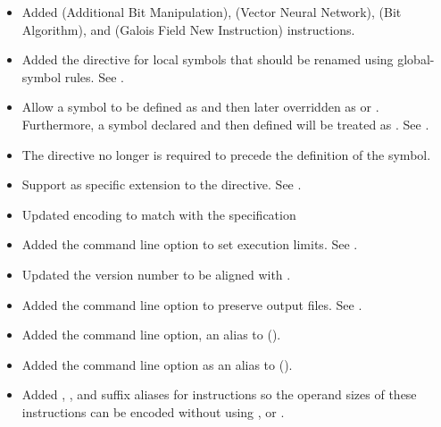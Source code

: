 \begin{itemize}
    \item{Added   (Additional Bit Manipulation), 
        (Vector Neural Network),  (Bit Algorithm), and  (Galois
        Field New Instruction) instructions.}

    \item{Added the  directive for local symbols that should be
        renamed using global-symbol rules. See .}

    \item{Allow a symbol to be defined as  and then later
        overridden as  or . Furthermore, a symbol
        declared  and then defined will be treated as .
        See .}

    \item{The  directive no longer is required to precede the
        definition of the symbol.}

    \item{Support  as  specific extension to the
         directive. See .}

    \item{Updated  encoding to match with the specification}

    \item{Added the  command line option to set execution
        limits. See .}

    \item{Updated the  version number to be aligned with .}

    \item{Added the  command line option to preserve output
        files. See .}

    \item{Added the  command line option, an alias to 
        ().}

    \item{Added the  command line option as an alias to 
        ().}

    \item{Added , , and  suffix aliases for 
        instructions so the operand sizes of these instructions can be
        encoded without using ,  or .}
\end{itemize}

